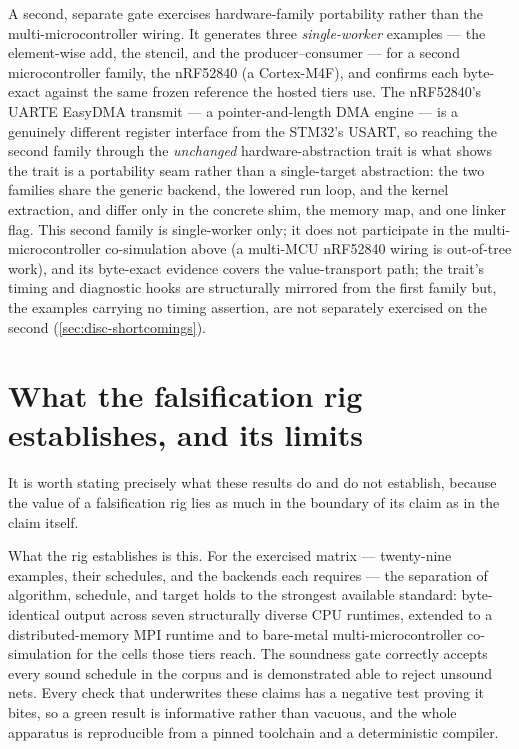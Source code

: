 A second, separate gate exercises hardware-family portability rather than the
multi-microcontroller wiring. It generates three \emph{single-worker} examples --- the
element-wise add, the stencil, and the producer--consumer --- for a second
microcontroller family, the nRF52840 (a Cortex-M4F), and confirms each byte-exact
against the same frozen reference the hosted tiers use. The nRF52840's UARTE EasyDMA
transmit --- a pointer-and-length DMA engine --- is a genuinely different register
interface from the STM32's USART, so reaching the second family through the
\emph{unchanged} hardware-abstraction trait is what shows the trait is a portability
seam rather than a single-target abstraction: the two families share the generic
backend, the lowered run loop, and the kernel extraction, and differ only in the
concrete shim, the memory map, and one linker flag. This second family is single-worker
only; it does not participate in the multi-microcontroller co-simulation above (a
multi-MCU nRF52840 wiring is out-of-tree work), and its byte-exact evidence covers the
value-transport path; the trait's timing and diagnostic hooks are structurally mirrored
from the first family but, the examples carrying no timing assertion, are not separately
exercised on the second (\cref{sec:disc-shortcomings}).

\section{What the falsification rig establishes, and its limits}\label{sec:res-limits}

It is worth stating precisely what these results do and do not establish, because
the value of a falsification rig lies as much in the boundary of its claim as in the
claim itself.

What the rig establishes is this. For the exercised matrix --- twenty-nine
examples, their schedules, and the backends each requires --- the separation of
algorithm, schedule, and target holds to the strongest available standard:
byte-identical output across seven structurally diverse CPU runtimes, extended to a
distributed-memory MPI runtime and to bare-metal multi-microcontroller
co-simulation for the cells those tiers reach. The soundness gate correctly accepts
every sound schedule in the corpus and is demonstrated able to reject unsound nets.
Every check that underwrites these claims has a negative test proving it bites, so a
green result is informative rather than vacuous, and the whole apparatus is
reproducible from a pinned toolchain and a deterministic compiler.

